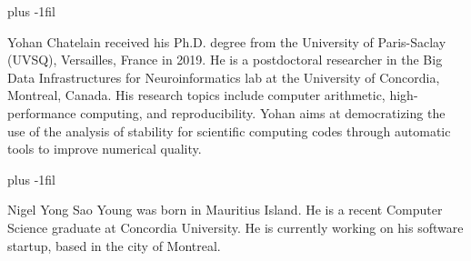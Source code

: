 \documentclass[10pt,journal,compsoc]{IEEEtran}
\begin{document}


% 

\baselineskip plus -1fil
\begin{IEEEbiography}{Yohan
        Chatelain} received his Ph.D. degree from the University of Paris-Saclay
    (UVSQ), Versailles, France in 2019. He is a postdoctoral researcher in the
    Big Data Infrastructures for Neuroinformatics lab at the University of
    Concordia, Montreal, Canada. His research topics include computer
    arithmetic, high-performance computing, and reproducibility. Yohan aims at
    democratizing the use of the analysis of stability for scientific computing
    codes through automatic tools to improve numerical quality. 
\end{IEEEbiography}

\baselineskip plus -1fil
\begin{IEEEbiography}{Nigel
        Yong Sao Young} was born in Mauritius Island. He is a recent Computer
    Science graduate at Concordia University. He is currently working on his
    software startup, based in the city of Montreal.
\end{IEEEbiography}
\end{document}
